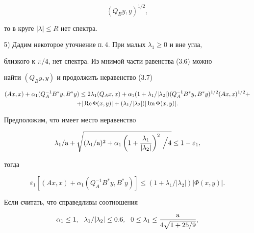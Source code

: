 \begin{pf}
\begin{equation}
(Q_B y,y)^{1/2}, 


\end{equation} 


то в круге $|\lambda|\le R$ нет спектра. 


 


5) Дадим некоторое уточнение п.\,4. При малых $\lambda_1\ge0$ и вне угла, 


близкого к $\pi/4$, нет спектра. Из мнимой части равенства (3.6) можно 


найти $(Q_B y,y)$ и продолжить неравенство (3.7) 


\begin{multline} 


(Ax,x)+\alpha_1(Q^{-1}_A B^*y,B^*y)\le 2\lambda_1(Q_A x,x)+ 


\alpha_1(1+\lambda_1/|\lambda_2|)(Q^{-1}_A B^*y,B^*y)^{1/2} 


(Ax,x)^{1/2} +\\ 


% 


+|\re\Phi(x,y)|+(\lambda_1/|\lambda_2|) 


|\im\Phi(x,y)|. 


\end{multline} 


Предположим, что имеет место неравенство 


\begin{equation} 


\lambda_1/\A+\sqrt{(\lambda_1/\A)^2+\alpha_1\left(1+ 


\frac{\lambda_1}{|\lambda_2|}\right)^2\,\Big/4}\le1-\varepsilon_1, 


\end{equation} 


тогда 


\begin{equation} 


\varepsilon_1[(Ax,x)+\alpha_1(Q^{-1}_A B^*y,B^*y)]\le 


(1+\lambda_1/|\lambda_2|)|\Phi(x,y)|. 


\end{equation} 


Если считать, что справедливы соотношения 


\begin{equation} 


\alpha_1\le1,\ \ \lambda_1/|\lambda_2|\le0.6, 


\ \ 0\le\lambda_1\le\frac{\A}{4\sqrt{1+25/9}}, 



\end{equation}
\end{pf}
